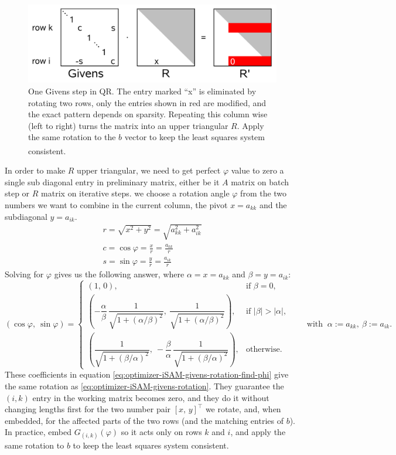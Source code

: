 \begin{figure}[H]
    \centering
    \includegraphics[width=0.9\linewidth]{Pictures/Optimizers/iSAM/Givens_Rotations.png}
    \caption{One Givens step in QR. The entry marked ``x'' is eliminated by rotating two rows, only the entries shown in red are modified, and the exact pattern depends on sparsity. Repeating this column wise (left to right) turns the matrix into an upper triangular $R$. Apply the same rotation to the $b$ vector to keep the least squares system consistent.\textsuperscript{\cite{iSAM_paper}}}
    \label{fig:givens-rotation}
\end{figure}
\noindent
In order to make $R$ upper triangular, we need to get perfect $\varphi$ value to zero a single sub diagonal entry in preliminary matrix, either be it $A$ matrix on batch step or $R$ matrix on iterative steps. we choose a rotation angle $\varphi$ from the two numbers we want to combine in the current column, the pivot $x=a_{kk}$ and the subdiagonal $y=a_{ik}$.
$$
    \begin{aligned}
        r=\sqrt{x^2+y^2}=\sqrt{a_{kk}^2+a_{ik}^2} \\
        c=\cos\varphi=\frac{x}{r}=\frac{a_{kk}}{r} \\
        s=\sin\varphi=\frac{y}{r}=\frac{a_{ik}}{r} 
    \end{aligned}
$$
Solving for $\varphi$ gives us the following answer, where $\alpha = x = a_{kk}$ and $\beta = y = a_{ik}$:
\begin{equation}
    (\cos\varphi,\ \sin\varphi)=
    \begin{cases}
    (1,\,0), & \text{if }\beta=0,\\[6pt]
    \left(-\dfrac{\alpha}{\beta}\,\dfrac{1}{\sqrt{1+(\alpha/\beta)^2}},\ \dfrac{1}{\sqrt{1+(\alpha/\beta)^2}}\right), & \text{if }|\beta|>|\alpha|,\\[10pt]
    \left(\dfrac{1}{\sqrt{1+(\beta/\alpha)^2}},\ -\dfrac{\beta}{\alpha}\,\dfrac{1}{\sqrt{1+(\beta/\alpha)^2}}\right), & \text{otherwise.}
    \end{cases}
    \qquad\text{with }\ \alpha:=a_{kk},\ \beta:=a_{ik}.
    \label{eq:optimizer-iSAM-givens-rotation-find-phi}
\end{equation}
These coefficients in equation \eqref{eq:optimizer-iSAM-givens-rotation-find-phi} give the same rotation as \eqref{eq:optimizer-iSAM-givens-rotation}. They guarantee the $(i,k)$ entry in the working matrix becomes zero, and they do it without changing lengths first for the two number pair $[x,\,y]^\top$ we rotate, and, when embedded, for the affected parts of the two rows (and the matching entries of $b$). In practice, embed $G_{(i,k)}(\varphi)$ so it acts only on rows $k$ and $i$, and apply the same rotation to $b$ to keep the least squares system consistent.



